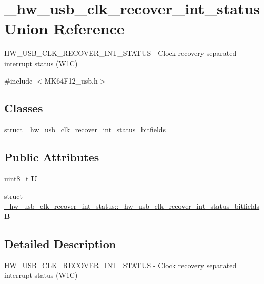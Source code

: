 \hypertarget{union__hw__usb__clk__recover__int__status}{}\section{\+\_\+hw\+\_\+usb\+\_\+clk\+\_\+recover\+\_\+int\+\_\+status Union Reference}
\label{union__hw__usb__clk__recover__int__status}


H\+W\+\_\+\+U\+S\+B\+\_\+\+C\+L\+K\+\_\+\+R\+E\+C\+O\+V\+E\+R\+\_\+\+I\+N\+T\+\_\+\+S\+T\+A\+T\+US -\/ Clock recovery separated interrupt status (W1C)  




{\ttfamily \#include $<$M\+K64\+F12\+\_\+usb.\+h$>$}

\subsection*{Classes}
\begin{DoxyCompactItemize}
\item 
struct \hyperlink{struct__hw__usb__clk__recover__int__status_1_1__hw__usb__clk__recover__int__status__bitfields}{\+\_\+hw\+\_\+usb\+\_\+clk\+\_\+recover\+\_\+int\+\_\+status\+\_\+bitfields}
\end{DoxyCompactItemize}
\subsection*{Public Attributes}
\begin{DoxyCompactItemize}
\item 
uint8\+\_\+t {\bfseries U}\hypertarget{union__hw__usb__clk__recover__int__status_a2ef3f106276d28eb5f418f8a37e418bf}{}\label{union__hw__usb__clk__recover__int__status_a2ef3f106276d28eb5f418f8a37e418bf}

\item 
struct \hyperlink{struct__hw__usb__clk__recover__int__status_1_1__hw__usb__clk__recover__int__status__bitfields}{\+\_\+hw\+\_\+usb\+\_\+clk\+\_\+recover\+\_\+int\+\_\+status\+::\+\_\+hw\+\_\+usb\+\_\+clk\+\_\+recover\+\_\+int\+\_\+status\+\_\+bitfields} {\bfseries B}\hypertarget{union__hw__usb__clk__recover__int__status_ab59622cd0359e95bfe5c0b3df9b85a9f}{}\label{union__hw__usb__clk__recover__int__status_ab59622cd0359e95bfe5c0b3df9b85a9f}

\end{DoxyCompactItemize}


\subsection{Detailed Description}
H\+W\+\_\+\+U\+S\+B\+\_\+\+C\+L\+K\+\_\+\+R\+E\+C\+O\+V\+E\+R\+\_\+\+I\+N\+T\+\_\+\+S\+T\+A\+T\+US -\/ Clock recovery separated interrupt status (W1C) 

